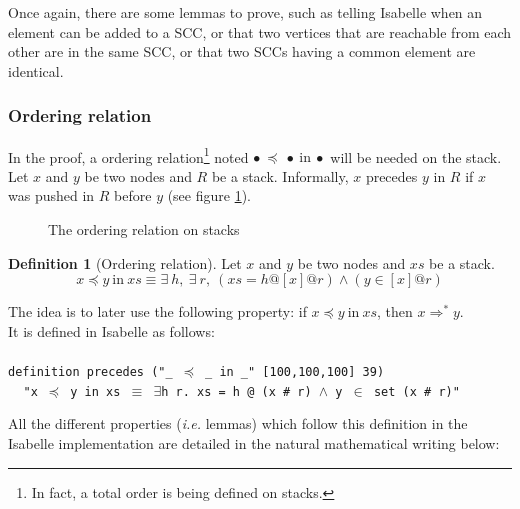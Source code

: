 \documentclass[a4 paper, 12pt]{article}
\newcommand{\where}{{\color{isa_green}{where}}}
\newcommand{\isa}[1]{\small\texttt{\\\noindent#1}}
\theoremstyle{definition}
\newtheorem{definition}{Definition}
\begin{document}
Once again, there are some lemmas to prove, such as telling Isabelle when an element can be added to a SCC, or that two vertices that are reachable from each other are in the same SCC, or that two SCCs having a common element are identical.\\

\subsubsection{Ordering relation}
In the proof, a ordering relation\footnote{In fact, a total order is being defined on stacks.} noted {\color{isa_dark_blue}$\bullet~\preceq~\bullet~\text{in}~\bullet$} will be needed on the stack. Let $x$ and $y$ be two nodes and $R$ be a stack. Informally, $x$ precedes $y$ in $R$ if $x$ was pushed in $R$ before $y$ (see figure \ref{fig:stackorder}).

\begin{figure}[!h]
    \caption{The ordering relation on stacks\label{fig:stackorder}}
\end{figure}

\begin{definition}[Ordering relation]
    Let $x$ and $y$ be two nodes and $xs$ be a stack.
    \begin{equation*}
        x \preceq y~\text{in}~xs \equiv \exists~h,~\exists~r,~(xs = h @ [x] @ r) \wedge (y \in [x]@r)
    \end{equation*}
\end{definition}


The idea is to later use the following property: if $x \preceq y~\text{in}~xs$, then $x \Rightarrow^* y$.\\
It is defined in Isabelle as follows:\\
\isa{
    {\color{isa_blue}definition} precedes ("\_ $\preceq$ \_ in \_" [100,100,100] 39) \where\\
$~~~~~$"{\color{isa_dark_green}x} $\preceq$ {\color{isa_dark_green}y} in {\color{isa_dark_green}xs} $\equiv$ $\exists${\color{isa_dark_green}h} {\color{isa_dark_green}r}. {\color{isa_dark_green}xs} = {\color{isa_dark_green}h} @ ({\color{isa_dark_green}x} \# {\color{isa_dark_green}r}) $\wedge$ {\color{isa_dark_green}y} $\in$ set ({\color{isa_dark_green}x} \# {\color{isa_dark_green}r})"\\
}

All the different properties (\textit{i.e.} lemmas) which follow this definition in the Isabelle implementation are detailed in the natural mathematical writing below:\\
\end{document}
